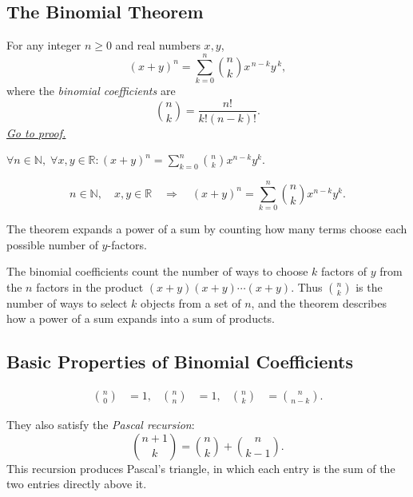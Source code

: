 
\subsection{The Binomial Theorem}
\label{sec:binomial-theorem}

\begin{theorem}
\label{thm:binomial-theorem}
For any integer \(n \ge 0\) and real numbers \(x,y\),
\[
(x+y)^n
=
\sum_{k=0}^{n} \binom{n}{k} x^{\,n-k} y^{\,k},
\]
where the \emph{binomial coefficients} are
\[
\binom{n}{k}
=
\frac{n!}{k!(n-k)!}.
\]
\hyperref[prf:binomial-theorem]{\textit{Go to proof.}}
\end{theorem}

\DefinitionalRoot

\begin{remark*}
\(\forall n \in \mathbb{N},\; \forall x,y \in \mathbb{R}: \displaystyle(x+y)^n = \sum_{k=0}^{n}\binom{n}{k}x^{n-k}y^{k}\).
\end{remark*}

\begin{remark*}
\[
  n\in\mathbb{N},\quad x,y\in\mathbb{R}
  \quad\Longrightarrow\quad
  (x+y)^n=\sum_{k=0}^{n}\binom{n}{k}x^{n-k}y^k.
\]
\end{remark*}

\begin{remark*}[Interpretation]
The theorem 
expands a power of a sum by counting how many terms choose each
possible number of \(y\)-factors.


The binomial coefficients count the number of ways to choose \(k\) factors of
\(y\) from the \(n\) factors in the product \((x+y)(x+y)\cdots(x+y)\).
Thus \(\binom{n}{k}\) is the number of ways to select \(k\) objects from a
set of \(n\), and the theorem describes how a power of a sum expands into
a sum of products.
\end{remark*}

\subsection*{Basic Properties of Binomial Coefficients}

\begin{remark*}[Interpretation]
\begin{align*}
\binom{n}{0} &= 1, &
\binom{n}{n} &= 1, &
\binom{n}{k} &= \binom{n}{n-k}.
\end{align*}

They also satisfy the \emph{Pascal recursion}:
\[
\binom{n+1}{k}
=
\binom{n}{k}+\binom{n}{k-1}.
\]
This recursion produces Pascal's triangle, in which each entry is the
sum of the two entries directly above it.
\end{remark*}

